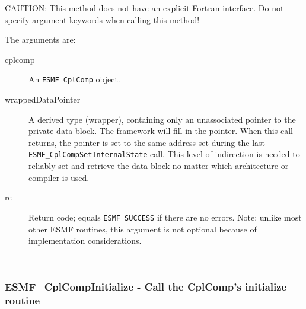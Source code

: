   CAUTION: This method does not have an explicit Fortran interface. Do not
   specify argument keywords when calling this method!
  
   The arguments are:
   \begin{description}
   \item[cplcomp]
     An {\tt ESMF\_CplComp} object.
   \item[wrappedDataPointer]
     A derived type (wrapper), containing only an unassociated pointer
     to the private data block.
     The framework will fill in the pointer. When this call returns, the
     pointer is set to the same address set during the last
     {\tt ESMF\_CplCompSetInternalState} call.
     This level of indirection is needed to reliably set and retrieve
     the data block no matter which architecture or compiler is used.
   \item[rc]
     Return code; equals {\tt ESMF\_SUCCESS} if there are no errors.
     Note: unlike most other ESMF routines, this argument is not optional
     because of implementation considerations.
   \end{description}
   
 
\mbox{}\hrulefill\ 
 
\subsubsection [ESMF\_CplCompInitialize] {ESMF\_CplCompInitialize - Call the CplComp's initialize routine}


